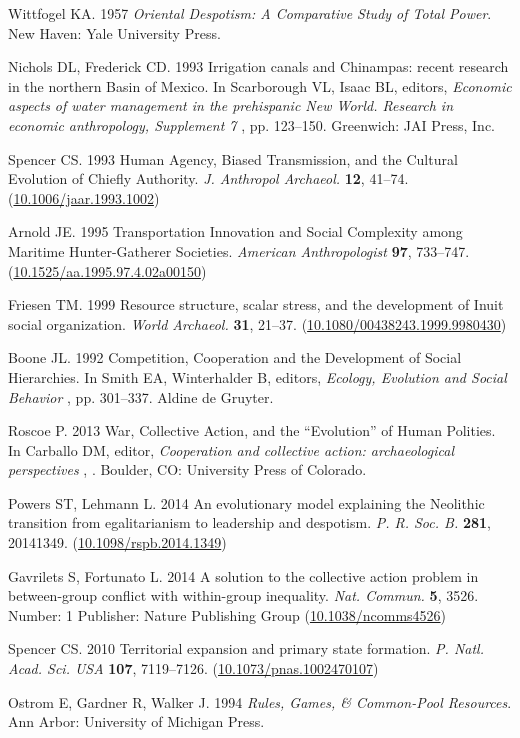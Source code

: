 \documentclass{rstb}
\begin{document}
\begin{thebibliography}{99}
Wittfogel KA. 1957 {\em Oriental Despotism: {A} Comparative Study of Total
  Power}.
New Haven: Yale University Press.

Nichols DL, Frederick CD. 1993  Irrigation canals and Chinampas: recent
  research in the northern {Basin of Mexico}. In Scarborough VL, Isaac BL,
  editors, {\em Economic aspects of water management in the prehispanic New
  World. Research in economic anthropology, Supplement 7} ,  pp. 123--150.
  Greenwich: JAI Press, Inc.

Spencer CS. 1993  Human Agency, Biased Transmission, and the Cultural Evolution
  of Chiefly Authority. {\em J. Anthropol Archaeol.}
  \textbf{12}, 41--74.
(\href{http://dx.doi.org/10.1006/jaar.1993.1002}{10.1006/jaar.1993.1002})

Arnold JE. 1995  Transportation Innovation and Social Complexity among Maritime
  Hunter-Gatherer Societies. {\em American Anthropologist} \textbf{97},
  733--747.
(\href{http://dx.doi.org/10.1525/aa.1995.97.4.02a00150}{10.1525/aa.1995.97.4.02a00150})

Friesen TM. 1999  Resource structure, scalar stress, and the development of
  {Inuit} social organization. {\em World Archaeol.} \textbf{31}, 21--37.
(\href{http://dx.doi.org/10.1080/00438243.1999.9980430}{10.1080/00438243.1999.9980430})

Boone JL. 1992  Competition, Cooperation and the Development of Social
  Hierarchies. In Smith EA, Winterhalder B, editors, {\em Ecology, Evolution
  and Social Behavior} ,  pp. 301--337. Aldine de Gruyter.

Roscoe P. 2013  War, Collective Action, and the ``Evolution'' of Human
  Polities. In Carballo DM, editor, {\em Cooperation and collective action:
  archaeological perspectives} , . Boulder, CO: University Press of Colorado.

Powers ST, Lehmann L. 2014  An evolutionary model explaining the {Neolithic}
  transition from egalitarianism to leadership and despotism. {\em P. R. Soc. B.} \textbf{281}, 20141349.
(\href{http://dx.doi.org/10.1098/rspb.2014.1349}{10.1098/rspb.2014.1349})

Gavrilets S, Fortunato L. 2014  A solution to the collective action problem in
  between-group conflict with within-group inequality. {\em Nat. Commun.}
  \textbf{5}, 3526.
Number: 1 Publisher: Nature Publishing Group
  (\href{http://dx.doi.org/10.1038/ncomms4526}{10.1038/ncomms4526})

Spencer CS. 2010  Territorial expansion and primary state formation. {\em
  P. Natl. Acad. Sci. USA} \textbf{107}, 7119--7126.
(\href{http://dx.doi.org/10.1073/pnas.1002470107}{10.1073/pnas.1002470107})

Ostrom E, Gardner R, Walker J. 1994 {\em Rules, Games, \& Common-Pool
  Resources}.
Ann Arbor: University of Michigan Press.

\end{thebibliography}
\end{document}
